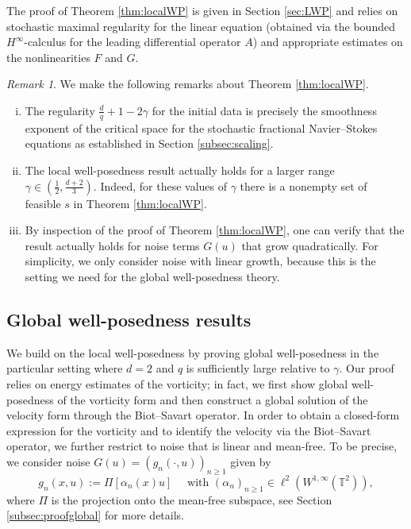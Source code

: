 \documentclass[11pt, a4paper,oneside, reqno]{amsart}
\theoremstyle{remark} %
\newtheorem{remark}[theorem]{Remark}
\theoremstyle{definition} %
\numberwithin{theorem}{section}
\numberwithin{equation}{section}
\newcommand{\T}{\mathbb{T}}
\newcommand{\Hinf}{H^{\infty}}
\newcommand{\gam}{\gamma}
\begin{document}
The proof of Theorem \ref{thm:localWP} is given in Section  \ref{sec:LWP} and relies on stochastic maximal regularity for the linear equation (obtained via the bounded $\Hinf$-calculus for the leading differential operator $A$) and appropriate estimates on the nonlinearities $F$ and $G$.


\begin{remark}
    We make the following remarks about Theorem \ref{thm:localWP}.
    \begin{enumerate}[(i)]
        \item The regularity $\frac{d}{q}+1-2\gam$ for the initial data is
precisely the smoothness exponent of the critical space for the stochastic fractional Navier--Stokes equations as established in Section \ref{subsec:scaling}.
        \item The local well-posedness result actually holds for a larger range $\gam\in (\frac 12, \frac{d+2}{3})$. Indeed, for these values of $\gam$ there is a nonempty set of feasible $s$ in Theorem \ref{thm:localWP}.
        \item By inspection of the proof of Theorem \ref{thm:localWP}, one can verify that the result actually holds for noise terms $G(u)$ that grow quadratically. For simplicity, we only consider noise with linear growth, because this is the setting we need for the global well-posedness theory.
    \end{enumerate}
\end{remark}






\subsection{Global well-posedness results}\label{subsec:GWP}
We build on the local well-posedness by proving global well-posedness in the particular setting where $d=2$ and $q$ is sufficiently large relative to $\gamma$. Our proof relies on energy estimates of the vorticity; in fact, we first show global well-posedness of the vorticity form and then construct a global solution of the velocity form through the Biot--Savart operator. In order to obtain a closed-form expression for the vorticity and to identify the velocity via the Biot--Savart operator, we further restrict to noise that is linear and mean-free. To be precise, we consider noise $G(u)=(g_n(\cdot, u))_{n\geq 1}$ given by
\begin{equation} \label{global_noise_thm}g_n(x,u):= \Pi[\alpha_n(x)u]\quad \text{ with }(\alpha_n)_{n\geq 1}\in \ell^2(W^{1,\infty}(\T^2)),\end{equation}
where $\Pi$ is the projection onto the mean-free subspace, see Section \ref{subsec:proofglobal} for more details. \\
\end{document}
